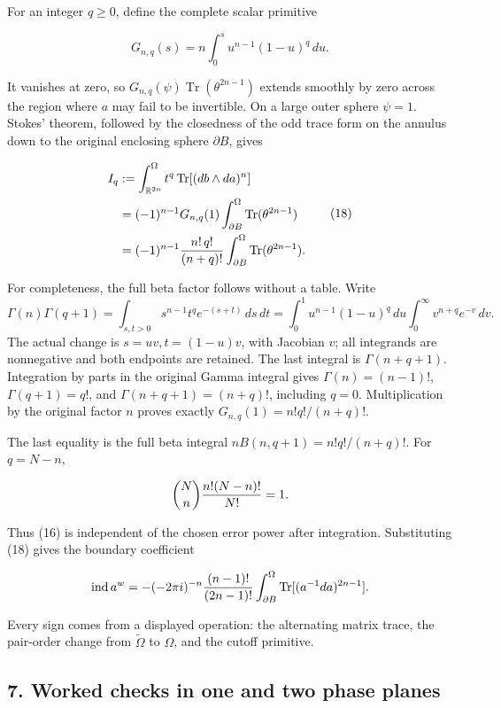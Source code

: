 \documentclass[
  11pt,
]{article}
\begin{document}
For an integer \(q\geq0\), define the complete scalar primitive

\[
 G_{n,q}(s)=n\int_0^s u^{n-1}(1-u)^q\,du.
\]

It vanishes at zero, so
\(G_{n,q}(\psi)\operatorname{Tr}(\theta^{2n-1})\) extends smoothly by
zero across the region where \(a\) may fail to be invertible. On a large
outer sphere \(\psi=1\). Stokes' theorem, followed by the closedness of
the odd trace form on the annulus down to the original enclosing sphere
\(\partial B\), gives

\[
 \begin{aligned}
 I_q
 &:=\int_{\mathbb R^{2n}}^{\Omega}
     t^q\operatorname{Tr}[(db\wedge da)^n]\\
 &=(-1)^{n-1}G_{n,q}(1)
    \int_{\partial B}^{\Omega}
       \operatorname{Tr}(\theta^{2n-1})\\
 &=(-1)^{n-1}{n!\,q!\over(n+q)!}
    \int_{\partial B}^{\Omega}
       \operatorname{Tr}(\theta^{2n-1}).
 \end{aligned}
 \tag{18}
\]

For completeness, the full beta factor follows without a table. Write \[
 \Gamma(n)\Gamma(q+1)
 =\int_{s,t>0}s^{n-1}t^q e^{-(s+t)}\,ds\,dt
 =\int_0^1u^{n-1}(1-u)^q\,du
       \int_0^\infty v^{n+q}e^{-v}\,dv.                  \tag{25}
\] The actual change is \(s=uv,t=(1-u)v\), with Jacobian \(v\); all
integrands are nonnegative and both endpoints are retained. The last
integral is \(\Gamma(n+q+1)\). Integration by parts in the original
Gamma integral gives \(\Gamma(n)=(n-1)!\), \(\Gamma(q+1)=q!\), and
\(\Gamma(n+q+1)=(n+q)!\), including \(q=0\). Multiplication by the
original factor \(n\) proves exactly \(G_{n,q}(1)=n!q!/(n+q)!\).

The last equality is the full beta integral \(nB(n,q+1)=n!q!/(n+q)!\).
For \(q=N-n\),

\[
 \binom Nn {n!(N-n)!\over N!}=1.
\]

Thus (16) is independent of the chosen error power after integration.
Substituting (18) gives the boundary coefficient

\[
 \operatorname{ind}a^w
 =-(-2\pi i)^{-n}{(n-1)!\over(2n-1)!}
   \int_{\partial B}^{\Omega}
      \operatorname{Tr}[(a^{-1}da)^{2n-1}].
\]

Every sign comes from a displayed operation: the alternating matrix
trace, the pair-order change from \(\widetilde\Omega\) to \(\Omega\),
and the cutoff primitive.

\subsection{7. Worked checks in one and two phase
planes}\label{worked-checks-in-one-and-two-phase-planes}
\end{document}
